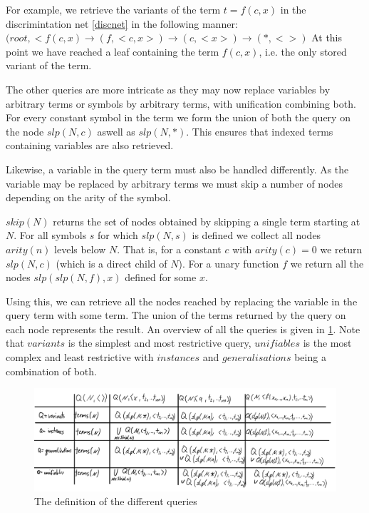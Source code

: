 For example, we retrieve the variants of the term $t = f(c,x)$ in the discrimintation net \ref{discnet} in the following manner:
$(root, <f(c,x) \rightarrow (f, <c,x>) \rightarrow (c, <x>) \rightarrow (*,<>)$
At this point we have reached a leaf containing the term $f(c,x)$, i.e. the only stored variant of the term.

The other queries are more intricate as they may now replace variables by arbitrary terms or symbols by arbitrary terms, with unification combining both. For every constant symbol in the term we form the union of both the query on the node $slp(N,c)$ aswell as $slp(N,*)$. This ensures that indexed terms containing variables are also retrieved.

Likewise, a variable in the query term must also be handled differently. As the variable may be replaced by arbitrary terms we must skip a number of nodes depending on the arity of the symbol.
\begin{defn}
  $skip(N)$ returns the set of nodes obtained by skipping a single term starting at $N$. For all symbols $s$ for which $slp(N,s)$ is defined we collect all nodes $arity(n)$ levels below $N$. That is, for a constant $c$ with $arity(c) = 0$ we return $slp(N,c)$ (which is a direct child of $N$). For a unary function $f$ we return all the nodes $slp(slp(N,f),x)$ defined for some $x$.
\end{defn}
Using this, we can retrieve all the nodes reached by replacing the variable in the query term with some term. The union of the terms returned by the query on each node represents the result. An overview of all the queries is given in \ref{discnetqueries}. Note that $variants$ is the simplest and most restrictive query, $unifiables$ is the most complex and least restrictive with $instances$ and $generalisations$ being a combination of both.

\begin{figure}[h]
\centering
\includegraphics[scale=0.25]{figures/disc_net_queries.png}
\caption{The definition of the different queries}
\label{discnetqueries}
\end{figure}

